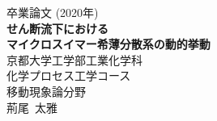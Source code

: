 \documentclass[11pt, a4j, dvipdfmx]{jarticle}
\begin{document}
\begin{titlepage}
    \begin{center}
        \vspace*{50truept}
        {\huge 卒業論文 (2020年)} \\
        \vspace*{100truept}
        {\huge \textbf{せん断流下における\\マイクロスイマー希薄分散系の動的挙動}} \\
        \vspace{120truept}
        {\LARGE 京都大学工学部工業化学科} \\
        {\LARGE 化学プロセス工学コース} \\
        {\LARGE 移動現象論分野} \\
        \vspace{50truept}
        {\LARGE 荊尾\ 太雅} \\
        \vspace{50truept}
    \end{center}
\end{titlepage}
\end{document}
